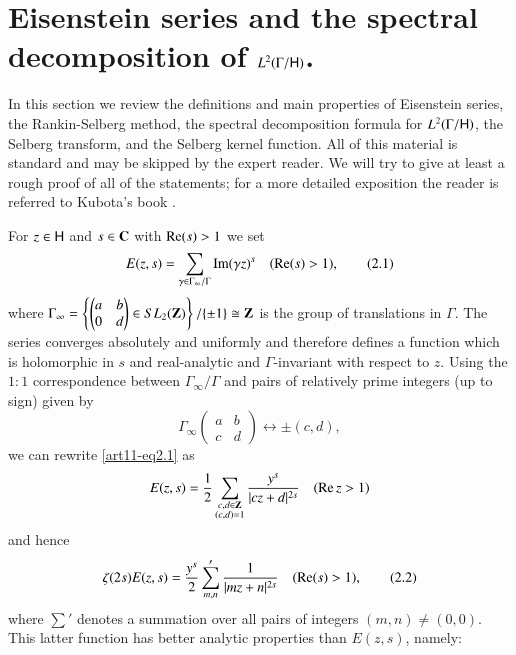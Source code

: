 \section{Eisenstein series and the spectral decomposition of $L^2 (\Gamma / \mathsf{H})$.}\label{art11-sec2}
In this section we review the definitions and main properties of Eisenstein series, the Rankin-Selberg method, the spectral decomposition formula for $L^2 (\Gamma / \mathsf{H})$, the Selberg transform, and the Selberg kernel function. All of this material is standard and may be skipped by the expert reader. We will try to give at least a rough proof of all of the statements; for a more detailed exposition the reader is referred to Kubota's book \cite{art11-4}.

\medskip
\noindent
{}
For $z \in \mathsf{H}$ and $s \in \mathbf{C}$ with $\operatorname{Re} (s) >1$ we set
\begin{equation*}
E(z,s ) = \sum\limits_{ \gamma \in \Gamma_\infty/ \Gamma} \operatorname{Im} (\gamma z)^s \quad (\operatorname{Re} (s) >1), \tag{2.1}\label{art11-eq2.1}
\end{equation*}
where $\Gamma_\infty = \left\{ \left(\begin{matrix}
a & b \\
0 &d
\end{matrix}
\right) \in SL_2(\mathbf{Z}) \right\} / \{\pm 1\} \cong\mathbf{Z}$ is the group of translations in $\Gamma$. The series converges absolutely and uniformly and therefore defines a function which is holomorphic in $s$ and real-analytic and $\Gamma$-invariant with respect to $z$. Using the $1:1$ correspondence between $\Gamma_\infty/ \Gamma$ and pairs of relatively prime integers (up to sign) given by 
$$
\Gamma_\infty \left(\begin{matrix}
a & b \\ c & d
\end{matrix}\right) \longleftrightarrow \pm (c,d),
$$ 
we can rewrite \eqref{art11-eq2.1} as 
$$
E(z, s) = \frac{1}{2} \sum\limits_{\substack{c , d \in \mathbf{Z}\\ (c,d) =1}} \frac{y^s}{|cz+d|^{2s}} \quad (\operatorname{Re} z > 1)
$$
and hence 
\begin{equation*}
\zeta(2s) E (z,s) =\frac{y^s}{2} \sum\limits'_{m,n} \frac{1}{|mz+n|^{2s}} \quad  (\operatorname{Re} (s) >1), \tag{2.2}\label{art11-eq2.2}
\end{equation*}
where $\sum'$ denotes a summation over all pairs of integers $(m,n) \neq (0,0)$. This latter function has better analytic properties than $E(z,s)$, namely:

